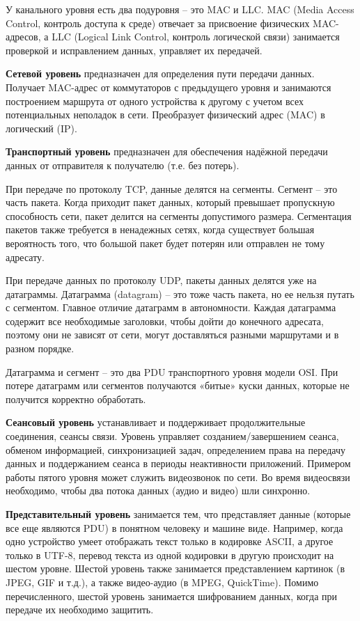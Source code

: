 У канального уровня есть два подуровня -- это MAC и LLC. MAC (Media Access Control, контроль доступа к среде) отвечает за присвоение физических MAC-адресов, а LLC (Logical Link Control, контроль логической связи) занимается проверкой и исправлением данных, управляет их передачей.

\textbf{Сетевой уровень} предназначен для определения пути передачи данных. Получает MAC-адрес от коммутаторов с предыдущего уровня и занимаются построением маршрута от одного устройства к другому с учетом всех потенциальных неполадок в сети. Преобразует физический адрес (MAC) в логический (IP).

\textbf{Транспортный уровень} предназначен для обеспечения надёжной передачи данных от отправителя к получателю (т.е. без потерь).

При передаче по протоколу TCP, данные делятся на сегменты. Сегмент -- это часть пакета. Когда приходит пакет данных, который превышает пропускную способность сети, пакет делится на сегменты допустимого размера. Сегментация пакетов также требуется в ненадежных сетях, когда существует большая вероятность того, что большой пакет будет потерян или отправлен не тому адресату.

При передаче данных по протоколу UDP, пакеты данных делятся уже на датаграммы. Датаграмма (datagram) -- это тоже часть пакета, но ее нельзя путать с сегментом. Главное отличие датаграмм в автономности. Каждая датаграмма содержит все необходимые заголовки, чтобы дойти до конечного адресата, поэтому они не зависят от сети, могут доставляться разными маршрутами и в разном порядке.

Датаграмма и сегмент -- это два PDU транспортного уровня модели OSI. При потере датаграмм или сегментов получаются «битые» куски данных, которые не получится корректно обработать.

\textbf{Сеансовый уровень} устанавливает и поддерживает продолжительные соединения, сеансы связи.
Уровень управляет созданием/завершением сеанса, обменом информацией, синхронизацией задач, определением права на передачу данных и поддержанием сеанса в периоды неактивности приложений.
Примером работы пятого уровня может служить видеозвонок по сети. Во время видеосвязи необходимо, чтобы два потока данных (аудио и видео) шли синхронно.

\textbf{Представительный уровень} занимается тем, что представляет данные (которые все еще являются PDU) в понятном человеку и машине виде. Например, когда одно устройство умеет отображать текст только в кодировке ASCII, а другое только в UTF-8, перевод текста из одной кодировки в другую происходит на шестом уровне.
Шестой уровень также занимается представлением картинок (в JPEG, GIF и т.д.), а также видео-аудио (в MPEG, QuickTime). Помимо перечисленного, шестой уровень занимается шифрованием данных, когда при передаче их необходимо защитить.

